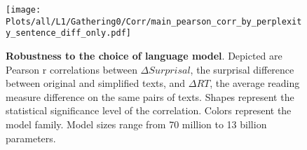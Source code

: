 \begin{figure}[ht]
    \centering
    \texttt{[image: Plots/all/L1/Gathering0/Corr/main\_pearson\_corr\_by\_perplexity\_sentence\_diff\_only.pdf]}
    \caption{\textbf{Robustness to the choice of language model}. Depicted are Pearson r correlations between $\Delta Surprisal$, the surprisal difference between
original and simplified texts, and $\Delta RT$, the average reading measure difference on the same pairs of texts. Shapes represent the statistical significance level of the correlation. Colors represent the model family. Model sizes range from 70 million to 13 billion parameters.}
    \label{fig:main_pearson_corr_by_perplexity_sentence_diff_only}
\end{figure}
    